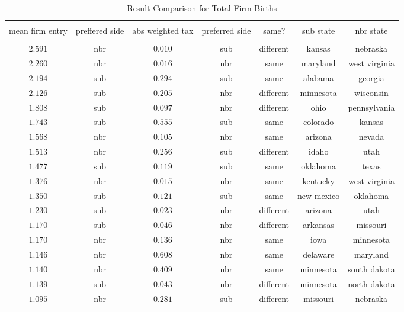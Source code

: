 
\begin{table}[!htbp] \centering 
  \caption{Result Comparison for Total Firm Births} 
  \label{} 
\tiny 
\begin{tabular}{@{\extracolsep{5pt}} ccccccc} 
\\[-1.8ex]\hline 
\hline \\[-1.8ex] 
mean firm entry & preffered side & abs weighted tax & preferred side & same? & sub state & nbr state \\ 
\hline \\[-1.8ex] 
$2.591$ & nbr & $0.010$ & sub & different & kansas & nebraska \\ 
$2.260$ & nbr & $0.016$ & nbr & same & maryland & west virginia \\ 
$2.194$ & sub & $0.294$ & sub & same & alabama & georgia \\ 
$2.126$ & sub & $0.205$ & nbr & different & minnesota & wisconsin \\ 
$1.808$ & sub & $0.097$ & nbr & different & ohio & pennsylvania \\ 
$1.743$ & sub & $0.555$ & sub & same & colorado & kansas \\ 
$1.568$ & nbr & $0.105$ & nbr & same & arizona & nevada \\ 
$1.513$ & nbr & $0.256$ & sub & different & idaho & utah \\ 
$1.477$ & sub & $0.119$ & sub & same & oklahoma & texas \\ 
$1.376$ & nbr & $0.015$ & nbr & same & kentucky & west virginia \\ 
$1.350$ & sub & $0.121$ & sub & same & new mexico & oklahoma \\ 
$1.230$ & sub & $0.023$ & nbr & different & arizona & utah \\ 
$1.170$ & sub & $0.046$ & nbr & different & arkansas & missouri \\ 
$1.170$ & nbr & $0.136$ & nbr & same & iowa & minnesota \\ 
$1.146$ & nbr & $0.608$ & nbr & same & delaware & maryland \\ 
$1.140$ & nbr & $0.409$ & nbr & same & minnesota & south dakota \\ 
$1.139$ & sub & $0.043$ & nbr & different & minnesota & north dakota \\ 
$1.095$ & nbr & $0.281$ & sub & different & missouri & nebraska \\ 

\end{tabular}
\end{table}
